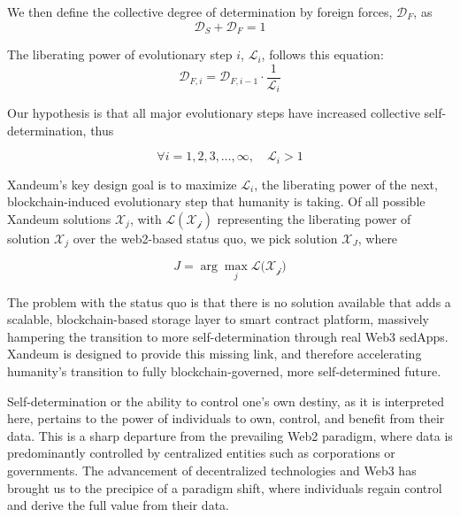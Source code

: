 \documentclass[11 pt]{article}   	%
\begin{document}
We then define the collective degree of determination by foreign forces, $\mathcal{D}_{F}$, as
\begin{equation}
\mathcal{D}_{S} + \mathcal{D}_{F} = 1 
\end{equation}

The liberating power of evolutionary step $i$, $\mathcal{L}_{\mathit{i}}$, follows this equation:
\begin{equation}
\mathcal{D}_{F,i} = \mathcal{D}_{F,i-1} \cdot \frac{1}{\mathcal{L_{\mathit{i}}}}
\end{equation}

Our hypothesis is that all major evolutionary steps have increased collective self-determination, thus

\begin{equation}
\forall i = 1, 2, 3, \ldots, \infty, \quad \mathcal{L}_{\mathit{i}} > 1
\end{equation}

Xandeum's key design goal is to maximize $\mathcal{L}_{\mathit{i}}$, the liberating power of the next, blockchain-induced evolutionary step that humanity is taking. Of all possible Xandeum solutions $\mathcal{X}_{j}$, with $\mathcal{L(\mathcal{X}_{j})}$ representing the liberating power of solution $\mathcal{X}_{j}$ over the web2-based status quo, we pick solution $\mathcal{X}_{J}$, where

\begin{equation}
J = \arg \max_{j} \mathcal{L(\mathcal{X_j)}}
\end{equation}

The problem with the status quo is that there is no solution available that adds a scalable, blockchain-based storage layer to smart contract platform, massively hampering the transition to more self-determination through real Web3 sedApps. Xandeum is designed to provide this missing link, and therefore accelerating humanity's transition to fully blockchain-governed, more self-determined future.

Self-determination or the ability to control one's own destiny, as it is interpreted here, pertains to the power of individuals to own, control, and benefit from their data. This is a sharp departure from the prevailing Web2 paradigm, where data is predominantly controlled by centralized entities such as corporations or governments. The advancement of decentralized technologies and Web3 has brought us to the precipice of a paradigm shift, where individuals regain control and derive the full value from their data.
\end{document}
